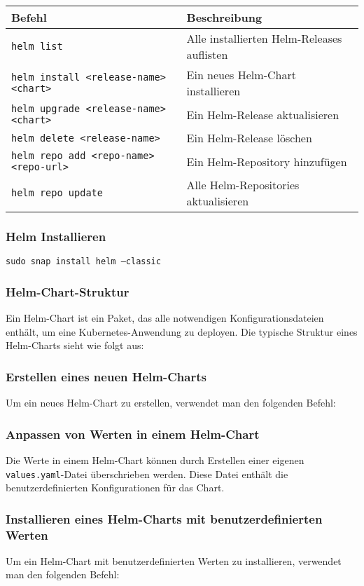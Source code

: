 \noindent
\begin{tabular}{
|p{}|p{}|}
\hline
\textbf{Befehl} & \textbf{Beschreibung} \\
\hline
\texttt{helm list} & Alle installierten Helm-Releases auflisten \\
\texttt{helm install <release-name> <chart>} & Ein neues Helm-Chart installieren \\
\texttt{helm upgrade <release-name> <chart>} & Ein Helm-Release aktualisieren \\
\texttt{helm delete <release-name>} & Ein Helm-Release löschen \\
\texttt{helm repo add <repo-name> <repo-url>} & Ein Helm-Repository hinzufügen \\
\texttt{helm repo update} & Alle Helm-Repositories aktualisieren \\
\hline
\end{tabular}
\subsubsection{Helm Installieren}
\texttt{sudo snap install helm --classic}

\subsubsection{Helm-Chart-Struktur}
Ein Helm-Chart ist ein Paket, das alle notwendigen Konfigurationsdateien enthält, um eine Kubernetes-Anwendung zu deployen. Die typische Struktur eines Helm-Charts sieht wie folgt aus:


\subsubsection{Erstellen eines neuen Helm-Charts}
Um ein neues Helm-Chart zu erstellen, verwendet man den folgenden Befehl:


\subsubsection{Anpassen von Werten in einem Helm-Chart}
Die Werte in einem Helm-Chart können durch Erstellen einer eigenen \texttt{values.yaml}-Datei überschrieben werden. Diese Datei enthält die benutzerdefinierten Konfigurationen für das Chart.


\subsubsection{Installieren eines Helm-Charts mit benutzerdefinierten Werten}
Um ein Helm-Chart mit benutzerdefinierten Werten zu installieren, verwendet man den folgenden Befehl:

\newpage

